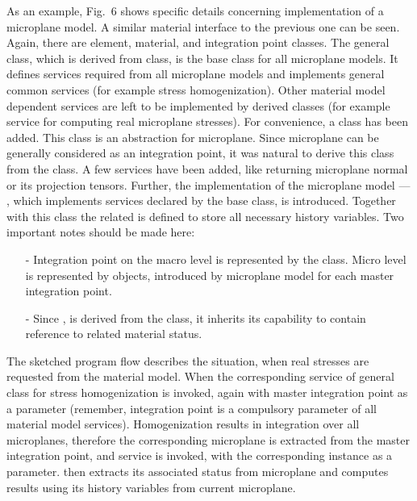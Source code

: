 \begin{htmlonly}
\begin{center}
As an example, Fig.~6 shows specific details
concerning implementation of a microplane model. A similar material
interface to the previous one can be seen. Again, there are element,
material, and integration point classes. 
The general  class, which is derived from
 class, is the base class for all microplane models.
It defines services required from all microplane models and
implements general common services (for example stress
homogenization). Other material model dependent services are left to
be implemented by derived classes (for example service for computing real microplane stresses). 
For convenience, a  class has been added.  This class is an
abstraction for microplane. Since microplane can be generally
considered as an integration point, it was natural to derive this class
from the  class. 
A few services have been added, like returning microplane normal or its projection tensors. 
Further, the implementation of the microplane model ---
, which implements services declared by the
base  class, is introduced. Together with this
class the related  is defined to store
all necessary history variables. 
Two important notes should be made here:
\begin{itemize}
\item[-]
Integration point on the macro level is represented by the  class. Micro level is represented by  objects,
introduced by microplane model for each master integration point. 
\item[-]
Since , is derived from the  class, it inherits its capability to contain reference to related material status.
\end{itemize}

The sketched program flow describes the situation, when real stresses are requested
from the material model. When the corresponding service of general
 class for stress homogenization is invoked, again
with master integration point as a parameter (remember, integration
point is a compulsory parameter of all material model services).
Homogenization results in integration over all microplanes, therefore
the corresponding microplane is extracted from the master integration point,
and  service is invoked, with
the corresponding  instance as a
parameter.  then extracts  its associated
status from microplane and computes results using its history variables from current microplane.


\end{center}
\end{htmlonly}
